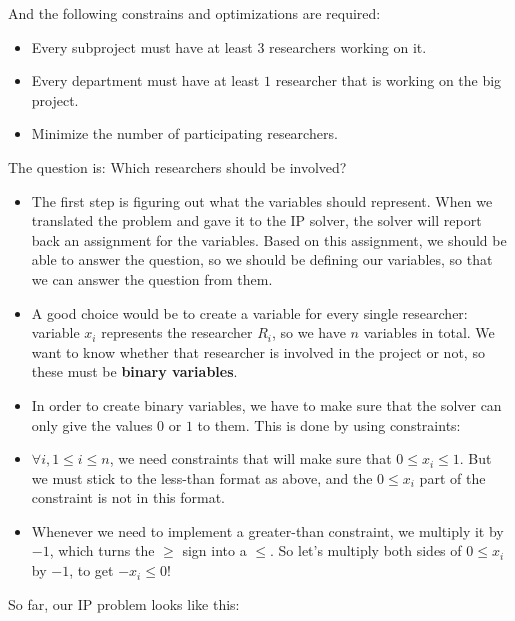 And the following constrains and optimizations are required:
\begin{itemize}
    \item Every subproject must have at least $3$ researchers working on it.
    \item Every department must have at least $1$ researcher that is working on the big project.
    \item Minimize the number of participating researchers.
\end{itemize}

The question is: Which researchers should be involved?

\begin{itemize}
    \item The first step is figuring out what the variables should represent. When we translated the problem and gave it to the IP solver, the solver will report back an assignment for the variables. Based on this assignment, we should be able to answer the question, so we should be defining our variables, so that we can answer the question from them.
    \item A good choice would be to create a variable for every single researcher: variable $x_i$ represents the researcher $R_i$, so we have $n$ variables in total. We want to know whether that researcher is involved in the project or not, so these must be \textbf{binary variables}.
    \item In order to create binary variables, we have to make sure that the solver can only give the values $0$ or $1$ to them. This is done by using constraints:
    \item $\forall{}i, 1\leq{}i\leq{}n$, we need constraints that will make sure that $0\leq{}x_i\leq{}1$. But we must stick to the less-than format as above, and the $0\leq{}x_i$ part of the constraint is not in this format.
    \item Whenever we need to implement a greater-than constraint, we multiply it by $-1$, which turns the $\geq{}$ sign into a $\leq{}$. So let's multiply both sides of $0\leq{}x_i$ by $-1$, to get $-x_i\leq{}0$!
\end{itemize}

So far, our IP problem looks like this:

